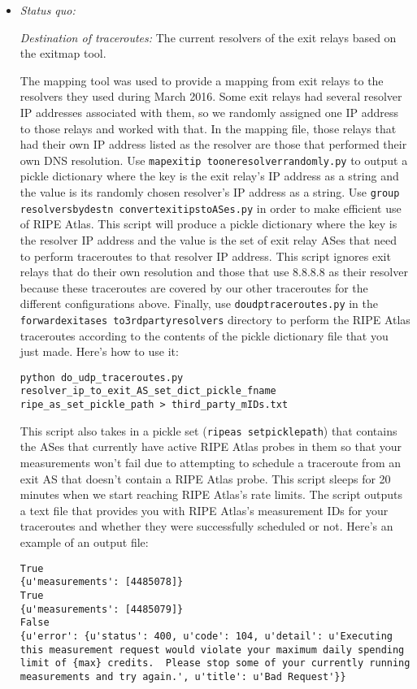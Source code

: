 \documentclass{article}
\begin{document}
\begin{itemize}
\item \emph{Status quo:}

\emph{Destination of traceroutes:} The current resolvers of the exit relays based on
the exitmap tool.

The mapping tool was used to provide a mapping from exit relays to the resolvers they used
during March 2016. Some exit relays had several resolver IP addresses associated with them,
so we randomly assigned one IP address to those relays and worked with that. In the
mapping file, those relays that had their own IP address listed as the resolver are those
that performed their own DNS resolution. Use
{\tt map\textunderscore exit\textunderscore ip\textunderscore
to\textunderscore one\textunderscore resolver\textunderscore randomly.py} to output a
pickle dictionary where the key is the exit relay's IP address as a string and the
value is its randomly chosen resolver's IP address as a string. Use {\tt group\textunderscore
resolvers\textunderscore by\textunderscore dest\textunderscore n\textunderscore
convert\textunderscore exit\textunderscore ips\textunderscore to\textunderscore ASes.py}
in order to make efficient use of RIPE Atlas. This script will produce a pickle
dictionary where the key is the resolver IP address and the value is the set of
exit relay ASes that need to perform traceroutes to that resolver IP address. This
script ignores exit relays that do their own resolution and those that use
8.8.8.8 as their resolver because these traceroutes are covered by our other
traceroutes for the different configurations above. Finally, use
{\tt do\textunderscore udp\textunderscore traceroutes.py} in the
{\tt forward\textunderscore exit\textunderscore ases\textunderscore
to\textunderscore 3rd\textunderscore party\textunderscore resolvers}
directory to perform the RIPE Atlas
traceroutes according to the contents of the pickle dictionary file that you
just made.
Here's how to use it:
\begin{lstlisting}
python do_udp_traceroutes.py resolver_ip_to_exit_AS_set_dict_pickle_fname ripe_as_set_pickle_path > third_party_mIDs.txt
\end{lstlisting}
This script also takes in a pickle set ({\tt ripe\textunderscore as\textunderscore
set\textunderscore pickle\textunderscore path})
that contains the ASes that
currently have active RIPE Atlas probes in them so that your measurements won't
fail due to attempting to schedule a traceroute from an exit AS that doesn't contain
a RIPE Atlas probe. This script sleeps for 20 minutes when we start reaching
RIPE Atlas's rate limits. The script outputs a text file that provides you with
RIPE Atlas's measurement IDs for your traceroutes and whether they were
successfully scheduled or not. Here's an example of an output file:
\begin{lstlisting}
True
{u'measurements': [4485078]}
True
{u'measurements': [4485079]}
False
{u'error': {u'status': 400, u'code': 104, u'detail': u'Executing this measurement request would violate your maximum daily spending limit of {max} credits.  Please stop some of your currently running measurements and try again.', u'title': u'Bad Request'}}
\end{lstlisting}


\end{itemize}
\end{document}
